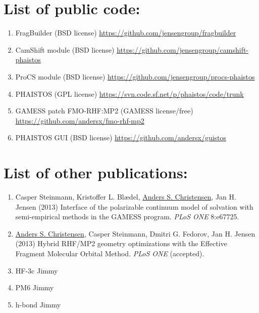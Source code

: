 \section*{List of public code:}
\begin{enumerate}
    \item FragBuilder (BSD license) \url{https://github.com/jensengroup/fragbuilder}
    \item CamShift module (BSD license) \url{https://github.com/jensengroup/camshift-phaistos}
    \item ProCS module (BSD license) \url{https://github.com/jensengroup/procs-phaistos}
    \item PHAISTOS (GPL license) \url{https://svn.code.sf.net/p/phaistos/code/trunk}
    \item GAMESS patch FMO-RHF:MP2 (GAMESS license/free) \url{https://github.com/andersx/fmo-rhf-mp2}
    \item PHAISTOS GUI (BSD license) \url{https://github.com/andersx/guistos}
\end{enumerate}
\section*{List of other publications:}
\begin{enumerate}
    \item Casper Steinmann, Kristoffer L. Blædel, \underline{Anders S. Christensen}, Jan H. Jensen (2013) Interface of the polarizable continuum model of solvation with semi-empirical methods in the GAMESS program. \textit{PLoS ONE} 8:e67725.
    \item \underline{Anders S. Christensen}, Casper Steinmann, Dmitri G. Fedorov, Jan H. Jensen (2013) Hybrid RHF/MP2 geometry optimizations with the Effective Fragment Molecular Orbital Method. \textit{PLoS ONE} (accepted).
    \item HF-3c Jimmy
    \item PM6 Jimmy
    \item h-bond Jimmy
\end{enumerate}

